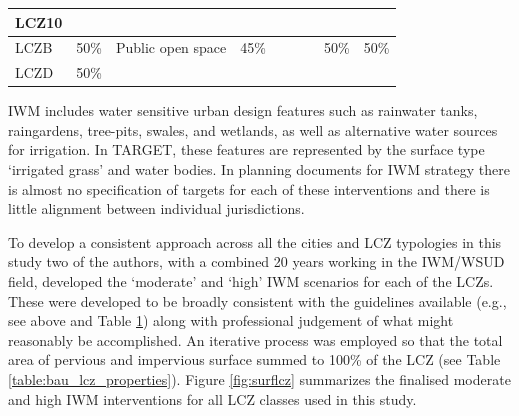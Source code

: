 \documentclass[utf8]{frontiersSCNS} %
\begin{document}
\begin{table}
\begin{tabular}{|p{0.85cm}|l|p{4.25cm}|l|p{3.75cm}|l|l|l|}
        LCZ10 \cellcolor{light-gray}& ~\cellcolor{light-blue!25} & ~\cellcolor{light-blue!25} & ~\cellcolor{light-blue!25} & ~\cellcolor{light-blue!25} & ~\cellcolor{light-blue!25} & ~\cellcolor{light-blue!25} & ~\cellcolor{light-blue!25} \\ \hline
        \rowcolor{light-gray} LCZB & 50\% & Public open space & 45\% & ~ & ~ & 50\% & 50\% \\ \hline
        LCZD \cellcolor{light-blue!25}& 50\% \cellcolor{light-blue!25}& ~\cellcolor{light-gray} & ~\cellcolor{light-gray} & ~\cellcolor{light-gray} & ~\cellcolor{light-gray} & ~\cellcolor{light-gray} & ~\cellcolor{light-gray} \\ \hline
    \end{tabular}\label{table:canopytargets}
\end{table}
\setlength\arrayrulewidth{0.4pt} %

IWM includes water sensitive urban design features such as rainwater tanks, raingardens, tree-pits, swales, and wetlands, as well as alternative water sources for irrigation. In TARGET, these features are represented by the surface type `irrigated grass' and water bodies. In planning documents for IWM strategy there is almost no specification of targets for each of these interventions and there is little alignment between individual jurisdictions.  

To develop a consistent approach across all the cities and LCZ typologies in this study two of the authors, with a combined 20 years working in the IWM/WSUD field, developed the `moderate' and `high' IWM scenarios for each of the LCZs. These were developed to be broadly consistent with the guidelines available (e.g., see above and Table \ref{table:canopytargets}) along with professional judgement of what might reasonably be accomplished. An iterative process was employed so that the total area of pervious and impervious surface summed to 100\% of the LCZ (see Table \ref{table:bau_lcz_properties}). Figure \ref{fig:surflcz} summarizes the finalised moderate and high IWM interventions for all LCZ classes used in this study.
\end{document}
